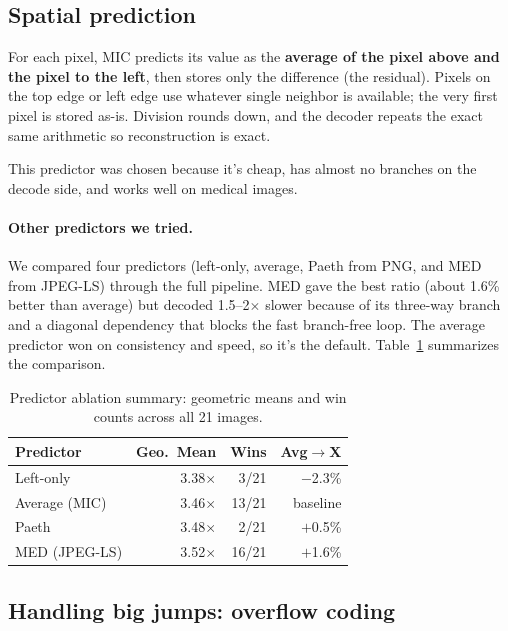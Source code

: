 \documentclass[11pt]{article}
\begin{document}
\subsection{Spatial prediction}

For each pixel, MIC predicts its value as the \textbf{average of the pixel
above and the pixel to the left}, then stores only the difference (the
residual). Pixels on the top edge or left edge use whatever single neighbor is
available; the very first pixel is stored as-is. Division rounds down, and
the decoder repeats the exact same arithmetic so reconstruction is exact.

This predictor was chosen because it's cheap, has almost no branches on the
decode side, and works well on medical images.

\paragraph{Other predictors we tried.} We compared four predictors (left-only,
average, Paeth from PNG, and MED from JPEG-LS) through the full pipeline.
MED gave the best ratio (about 1.6\% better than average) but decoded
1.5--2$\times$ slower because of its three-way branch and a diagonal dependency
that blocks the fast branch-free loop. The average predictor won on
consistency and speed, so it's the default. Table~\ref{tab:predictor-summary}
summarizes the comparison.

\begin{table}[htbp]
\centering
\caption{Predictor ablation summary: geometric means and win counts across all
21 images.}
\label{tab:predictor-summary}
\begin{tabular}{lrrr}
\toprule
Predictor & Geo.\ Mean & Wins & Avg$\to$X \\
\midrule
Left-only & 3.38$\times$ & 3/21 & $-$2.3\% \\
Average (MIC) & 3.46$\times$ & 13/21 & baseline \\
Paeth & 3.48$\times$ & 2/21 & $+$0.5\% \\
MED (JPEG-LS) & 3.52$\times$ & 16/21 & $+$1.6\% \\
\bottomrule
\end{tabular}
\end{table}

\subsection{Handling big jumps: overflow coding}
\end{document}
